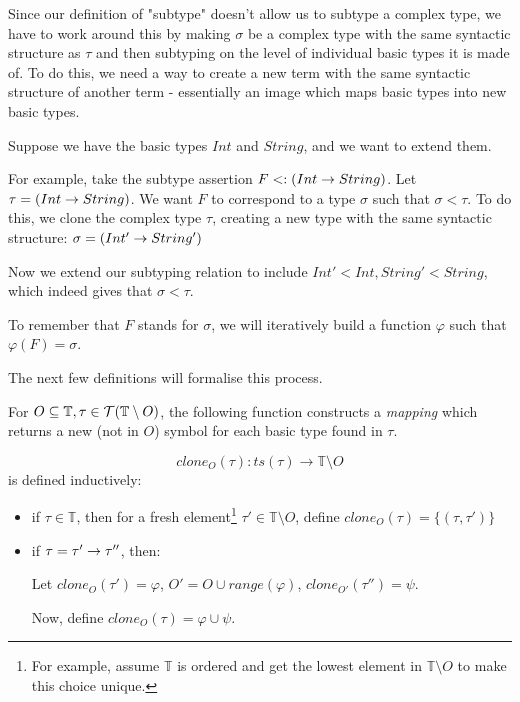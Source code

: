\documentclass[main.tex]{subfiles}
\begin{document}
Since our definition of "subtype" doesn't allow us to subtype a complex type,
we have to work around this by making $\sigma$ be a complex type with the same
syntactic structure as $\tau$ and then subtyping on the level of individual
basic types it is made of. To do this, we need a way to create a new term
with the same syntactic structure of another term - essentially an image which
maps basic types into new basic types.

\begin{example}
    Suppose we have the basic types $Int$ and $String$, and we want to extend
    them.

    For example, take the subtype assertion $F <: ( Int \rightarrow String )$.
    Let $\tau = ( Int \rightarrow String )$. We want $F$ to correspond to a type
    $\sigma$ such that $\sigma \less \tau$. To do this, we clone
    the complex type $\tau$, creating a new type with the same
    syntactic structure: $\sigma = ( Int' \rightarrow String' )$

    Now we extend our subtyping relation to include $ Int' \less Int, String' \less String $,
    which indeed gives that $\sigma \less \tau$.

    To remember that $F$ stands for $\sigma$, we will iteratively build a
    function $\varphi$ such that $\varphi(F) = \sigma$.

    The next few definitions will formalise this process.
\end{example}

\begin{defn}
    For $O \subseteq \mathbb{T}, \tau \in \mathcal{T}( \mathbb{T} \setminus O )$,
    the following function constructs a \emph{mapping} which returns a new (not
    in $O$) symbol for each basic type found in $\tau$.

    \[ clone_O(\tau) : ts(\tau) \rightarrow \mathbb{T} \setminus O \]
    is defined inductively:
    \begin{itemize}
        \item if $\tau \in \mathbb{T}$, then for a fresh element\footnote{
            For example, assume $\mathbb{T}$ is ordered and get the lowest element
            in $\mathbb{T} \setminus O$ to make this choice unique.}
            $\tau' \in \mathbb{T} \setminus O$, define
            $clone_O(\tau) = \{ (\tau, \tau') \}$
        \item if $\tau = \tau' \rightarrow \tau''$, then:

            Let $clone_O(\tau') = \varphi$, $O' = O \cup range(\varphi)$,
            $clone_{O'}(\tau'') = \psi$.

            Now, define $clone_O(\tau) = \varphi \cup \psi$.
    \end{itemize}
\end{defn}
\end{document}
